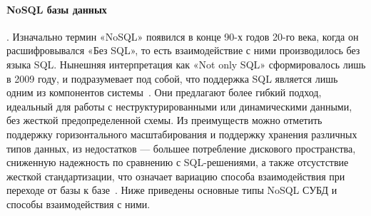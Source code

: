 \paragraph{NoSQL базы данных}. Изначально термин «NoSQL» появился в конце 90-х годов 20-го века,
когда он расшифровывался «Без SQL», то есть взаимодействие с ними производилось без языка SQL.
Нынешняя интерпретация как «Not only SQL» сформировалось лишь в 2009 году, и  подразумевает под собой,
что поддержка SQL является лишь одним из  компонентов системы~\cite{savoskinIssledovanieSposobovPrimeneniya2019,
	smallcombeSQLVsNoSQL}. Они предлагают более гибкий подход, идеальный для работы с неструктурированными или
динамическими данными, без жесткой предопределенной схемы.
Из преимуществ можно отметить поддержку горизонтального масштабирования и поддержку хранения различных типов данных,
из недостатков --- большее потребление дискового пространства, сниженную надежность по сравнению с SQL-решениями, а также
отсустствие жесткой стандартизации, что означает вариацию способа взаимодействия при переходе от базы к
базе~\cite{savoskinIssledovanieSposobovPrimeneniya2019, koryaginModeliBazDannyh2020,smallcombeSQLVsNoSQL,
	kleymenovNoSQLRelyacionnyeBazy2022, savoskinIssledovanieSposobovPrimeneniya2019}.
Ниже приведены основные типы NoSQL СУБД и способы взаимодействия с ними.
